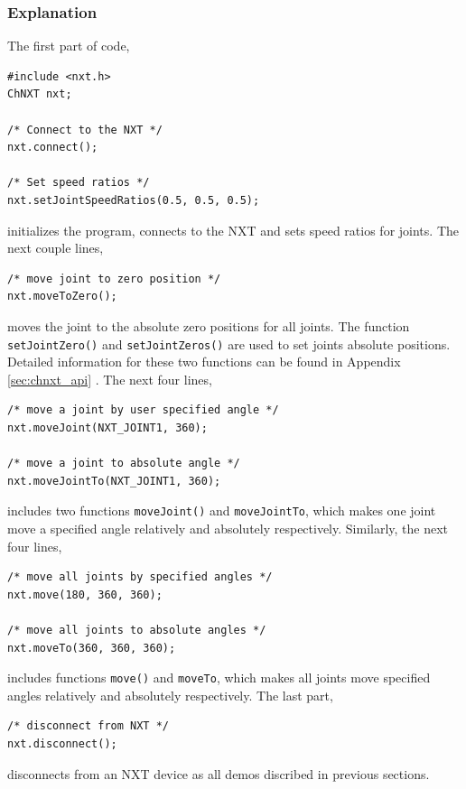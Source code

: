 \documentclass[11pt]{article}
\begin{document}
\subsubsection*{Explanation}
The first part of code,

\begin{verbatim}
#include <nxt.h>
ChNXT nxt;

/* Connect to the NXT */
nxt.connect();

/* Set speed ratios */
nxt.setJointSpeedRatios(0.5, 0.5, 0.5);
\end{verbatim}

initializes the program, connects to the NXT and sets speed ratios for joints. The next couple lines,

\begin{verbatim}
/* move joint to zero position */
nxt.moveToZero();
\end{verbatim}

moves the joint to the absolute zero positions for all joints. The function \texttt{setJointZero()} and \texttt{setJointZeros()} 
are used to set joints absolute positions. Detailed information for these two functions can be found in Appendix \ref{sec:chnxt_api}
. The next four lines,

\begin{verbatim}
/* move a joint by user specified angle */
nxt.moveJoint(NXT_JOINT1, 360);

/* move a joint to absolute angle */
nxt.moveJointTo(NXT_JOINT1, 360);
\end{verbatim}
includes two functions \texttt{moveJoint()} and \texttt{moveJointTo}, which makes one joint move a specified angle
relatively and absolutely respectively. Similarly, the next four lines,
\begin{verbatim}
/* move all joints by specified angles */
nxt.move(180, 360, 360);

/* move all joints to absolute angles */
nxt.moveTo(360, 360, 360);
\end{verbatim}
includes functions \texttt{move()} and \texttt{moveTo}, which makes all joints move specified angles relatively and absolutely respectively. The last part,
\begin{verbatim}
/* disconnect from NXT */
nxt.disconnect();
\end{verbatim}
disconnects from an NXT device as all demos discribed in previous sections.
\end{document}
